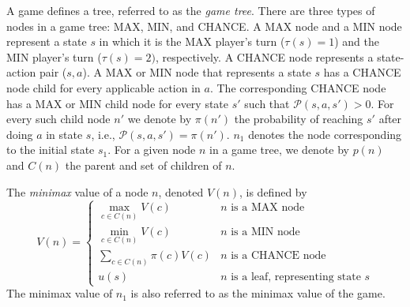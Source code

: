 \documentclass[runningheads]{llncs}
\newcounter{bab}
\newcommand{\MM}{\mathit{V}}
\newcommand{\rootnode}{\mathit{n_1}}
\begin{document}
A game defines a tree, referred to as the \emph{game tree}.
There are three types of nodes in a game tree: MAX, MIN, and CHANCE. 
A MAX node and a MIN node represent a state $s$ in which it is the MAX player's  turn ($\tau(s)=1$) and the MIN player's turn ($\tau(s)=2)$, respectively. 
A CHANCE node represents a state-action pair ($s,a$). 
A MAX or MIN node that represents a state $s$ 
has a CHANCE node child for every applicable action in $a$. 
The corresponding CHANCE node has a MAX or MIN child node for every state $s'$ 
such that $\mathcal{P}(s,a,s')>0$. For every such child node $n'$ we denote by $\pi(n')$ the probability of reaching $s'$ after doing $a$ in state $s$, i.e., $\mathcal{P}(s,a,s')=\pi(n')$. 
$\rootnode$ denotes the node corresponding to the initial state $s_1$. 
For a given node $n$ in a game tree, we denote by $p(n)$ and $C(n)$ the parent and set of children of $n$.



The \emph{minimax} value of a node $n$, denoted $\MM(n)$, is defined by
\begin{equation} 
  \MM(n) \!=\!
    \begin{cases} 
      \max\limits_{c\in C(n)} \MM(c) & \!n \text{ is a MAX node} \\
      \min\limits_{c\in C(n)} \MM(c) & \!n \text{ is a MIN node} \\
      \sum\limits_{c\in C(n)\!\!\!\!\!\!\!\!\!\!\!\!} \pi(c) \MM(c) & \!n \text{ is a CHANCE node} \\
      u(s) & \!n \text{ is a leaf, representing state } s\!\!\!\!\!\!
     \end{cases}
   \label{eq:mm-value-chance}
\end{equation}
The minimax value of $\rootnode{}$ is also referred to as the minimax value of the game. 
\end{document}
